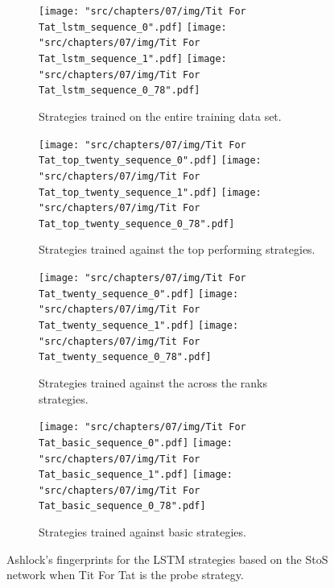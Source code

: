 \begin{figure}[!htbp]
    \begin{subfigure}{\textwidth}
        \texttt{[image: "src/chapters/07/img/Tit For Tat\_lstm\_sequence\_0".pdf]}
        \texttt{[image: "src/chapters/07/img/Tit For Tat\_lstm\_sequence\_1".pdf]}
        \texttt{[image: "src/chapters/07/img/Tit For Tat\_lstm\_sequence\_0\_78".pdf]}
        \caption{Strategies trained on the entire training data set.}
    \end{subfigure}
    \begin{subfigure}{\textwidth}
        \texttt{[image: "src/chapters/07/img/Tit For Tat\_top\_twenty\_sequence\_0".pdf]}
        \texttt{[image: "src/chapters/07/img/Tit For Tat\_top\_twenty\_sequence\_1".pdf]}
        \texttt{[image: "src/chapters/07/img/Tit For Tat\_top\_twenty\_sequence\_0\_78".pdf]}
        \caption{Strategies trained against the top performing strategies.}
    \end{subfigure}
    \begin{subfigure}{\textwidth}
        \texttt{[image: "src/chapters/07/img/Tit For Tat\_twenty\_sequence\_0".pdf]}
        \texttt{[image: "src/chapters/07/img/Tit For Tat\_twenty\_sequence\_1".pdf]}
        \texttt{[image: "src/chapters/07/img/Tit For Tat\_twenty\_sequence\_0\_78".pdf]}
        \caption{Strategies trained against the across the ranks strategies.}
    \end{subfigure}
    \begin{subfigure}{\textwidth}
        \texttt{[image: "src/chapters/07/img/Tit For Tat\_basic\_sequence\_0".pdf]}
        \texttt{[image: "src/chapters/07/img/Tit For Tat\_basic\_sequence\_1".pdf]}
        \texttt{[image: "src/chapters/07/img/Tit For Tat\_basic\_sequence\_0\_78".pdf]}
        \caption{Strategies trained against basic strategies.}
    \end{subfigure}
    \caption{Ashlock's fingerprints for the LSTM strategies based on the StoS
    network when Tit For Tat is the probe strategy.}\label{fig:ashlock_fingerprints_tft_s_to_s}
\end{figure}

